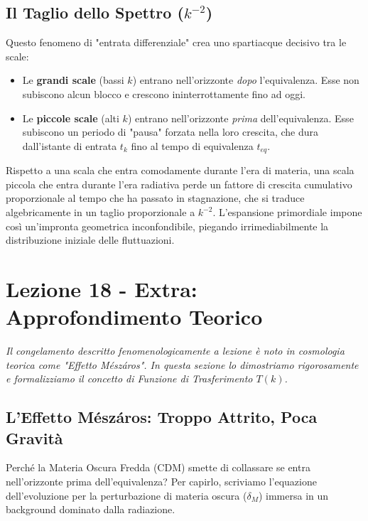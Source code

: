 \documentclass[11pt,a4paper]{report}
\begin{document}
\subsection{Il Taglio dello Spettro ($k^{-2}$)}
Questo fenomeno di "entrata differenziale" crea uno spartiacque decisivo tra le scale:
\begin{itemize}
    \item Le \textbf{grandi scale} (bassi $k$) entrano nell'orizzonte \textit{dopo} l'equivalenza. Esse non subiscono alcun blocco e crescono ininterrottamente fino ad oggi.
    \item Le \textbf{piccole scale} (alti $k$) entrano nell'orizzonte \textit{prima} dell'equivalenza. Esse subiscono un periodo di "pausa" forzata nella loro crescita, che dura dall'istante di entrata $t_k$ fino al tempo di equivalenza $t_{eq}$.
\end{itemize}
Rispetto a una scala che entra comodamente durante l'era di materia, una scala piccola che entra durante l'era radiativa perde un fattore di crescita cumulativo proporzionale al tempo che ha passato in stagnazione, che si traduce algebricamente in un taglio proporzionale a $k^{-2}$. L'espansione primordiale impone così un'impronta geometrica inconfondibile, piegando irrimediabilmente la distribuzione iniziale delle fluttuazioni.

\newpage
\section{Lezione 18 - Extra: Approfondimento Teorico}

\textit{Il congelamento descritto fenomenologicamente a lezione è noto in cosmologia teorica come "Effetto Mészáros". In questa sezione lo dimostriamo rigorosamente e formalizziamo il concetto di Funzione di Trasferimento $T(k)$.}

\subsection{L'Effetto Mészáros: Troppo Attrito, Poca Gravità}
Perché la Materia Oscura Fredda (CDM) smette di collassare se entra nell'orizzonte prima dell'equivalenza? Per capirlo, scriviamo l'equazione dell'evoluzione per la perturbazione di materia oscura ($\delta_M$) immersa in un background dominato dalla radiazione.
\end{document}
